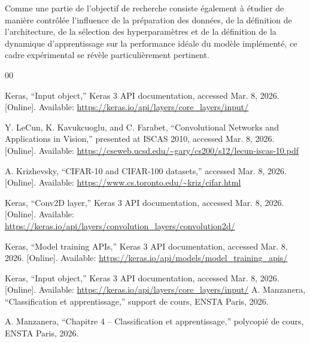 \documentclass[conference]{IEEEtran}
\begin{document}
Comme une partie de l’objectif de recherche consiste également à étudier de manière contrôlée l’influence de la préparation des données, de la définition de l’architecture, de la sélection des hyperparamètres et de la définition de la dynamique d’apprentissage sur la performance idéale du modèle implémenté, ce cadre expérimental se révèle particulièrement pertinent.









\begin{thebibliography}{00}
    
Keras, ``Input object,'' Keras 3 API documentation, accessed Mar. 8, 2026. [Online]. Available: \url{https://keras.io/api/layers/core_layers/input/}

Y. LeCun, K. Kavukcuoglu, and C. Farabet, ``Convolutional Networks and Applications in Vision,'' presented at ISCAS 2010, accessed Mar. 8, 2026. [Online]. Available: \url{https://cseweb.ucsd.edu/~gary/cs200/s12/lecun-iscas-10.pdf}

A. Krizhevsky, ``CIFAR-10 and CIFAR-100 datasets,'' accessed Mar. 8, 2026. [Online]. Available: \url{https://www.cs.toronto.edu/~kriz/cifar.html}

Keras, ``Conv2D layer,'' Keras 3 API documentation, accessed Mar. 8, 2026. [Online]. Available: \url{https://keras.io/api/layers/convolution_layers/convolution2d/}

Keras, ``Model training APIs,'' Keras 3 API documentation, accessed Mar. 8, 2026. [Online]. Available: \url{https://keras.io/api/models/model_training_apis/}

Keras, ``Input object,'' Keras 3 API documentation, accessed Mar. 8, 2026. [Online]. Available: \url{https://keras.io/api/layers/core_layers/input/}
A. Manzanera, ``Classification et apprentissage,'' support de cours, ENSTA Paris, 2026.

A. Manzanera, ``Chapitre 4 -- Classification et apprentissage,'' polycopi\'e de cours, ENSTA Paris, 2026.
\end{thebibliography}
\end{document}
